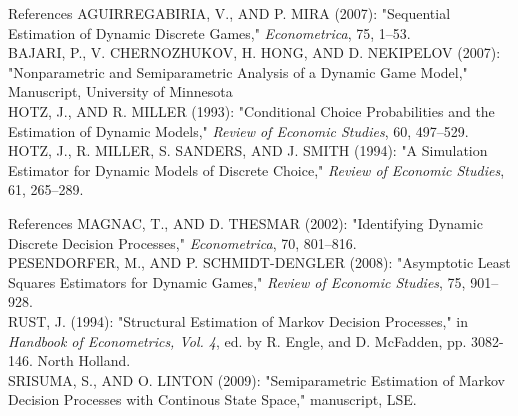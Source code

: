 \begin{frame}{References}
AGUIRREGABIRIA, V., AND P. MIRA (2007): "Sequential Estimation of Dynamic Discrete Games," \emph{Econometrica}, 75, 1--53. \\
\vspace{2mm}
BAJARI, P., V. CHERNOZHUKOV, H. HONG, AND D. NEKIPELOV (2007): "Nonparametric and Semiparametric Analysis of a Dynamic Game Model," Manuscript, University of Minnesota \\
\vspace{2mm}
HOTZ, J., AND R. MILLER (1993): "Conditional Choice Probabilities and the Estimation of Dynamic Models," \emph{Review of Economic Studies}, 60, 497--529. \\
\vspace{2mm}
HOTZ, J., R. MILLER, S. SANDERS, AND J. SMITH (1994): "A Simulation Estimator for Dynamic Models of Discrete Choice," \emph{Review of Economic Studies}, 61, 265--289.\\
\end{frame}

\begin{frame}{References}
MAGNAC, T., AND D. THESMAR (2002): "Identifying Dynamic Discrete Decision Processes," \emph{Econometrica}, 70, 801--816.\\
\vspace{2mm}
PESENDORFER, M., AND P. SCHMIDT-DENGLER (2008): "Asymptotic Least Squares Estimators for Dynamic Games," \emph{Review of Economic Studies}, 75, 901--928. \\
\vspace{2mm}
RUST, J. (1994): "Structural Estimation of Markov Decision Processes," in \emph{Handbook of Econometrics, Vol. 4}, ed. by R. Engle, and D. McFadden, pp. 3082-146. North Holland.\\
\vspace{2mm}
SRISUMA, S., AND O. LINTON (2009): "Semiparametric Estimation of Markov Decision Processes with Continous State Space," manuscript, LSE. 
\end{frame}




















































